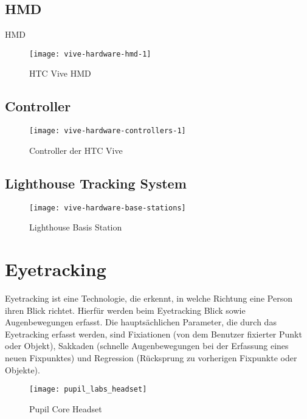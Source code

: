 \cite{Clay_Koenig_Koenig_2019}
\subsection{\acl{HMD}}
\ac{HMD}

\begin{figure}[!htbp]
	\centering
	\texttt{[image: vive-hardware-hmd-1]}
	\caption[HTC Vive HMD]{HTC Vive \acs{HMD} \cite{ViveHMD}}
	\label{fig:vive-hardware-hmd-1}
\end{figure}


\subsection{Controller}
\begin{figure}[!htbp]
	\centering
	\texttt{[image: vive-hardware-controllers-1]}
	\caption[Controller der HTC Vive]{Controller der HTC Vive \cite{ViveControllers}}
	\label{fig:vive-hardware-controllers-1}
\end{figure}

\subsection{Lighthouse Tracking System}
\begin{figure}[!htbp]
	\centering
	\texttt{[image: vive-hardware-base-stations]}
	\caption[Lighthouse Basis Station]{Lighthouse Basis Station \cite{ViveBaseStation}}
	\label{fig:vive-hardware-base-stations}
\end{figure}

\section{Eyetracking}
Eyetracking ist eine Technologie, die erkennt, in welche Richtung eine Person ihren Blick richtet. Hierfür werden beim Eyetracking Blick sowie Augenbewegungen erfasst. Die hauptsächlichen Parameter, die durch das Eyetracking erfasst werden, sind Fixiationen (von dem Benutzer fixierter Punkt oder Objekt), Sakkaden (schnelle Augenbewegungen bei der Erfassung eines neuen Fixpunktes) und Regression (Rücksprung zu vorherigen Fixpunkte oder Objekte).

\begin{figure}[!htbp]
	\centering
	\texttt{[image: pupil\_labs\_headset]}
	\caption[Pupil Core Headset]{Pupil Core Headset}
	\label{fig:pupil_labs_headset}
\end{figure}

